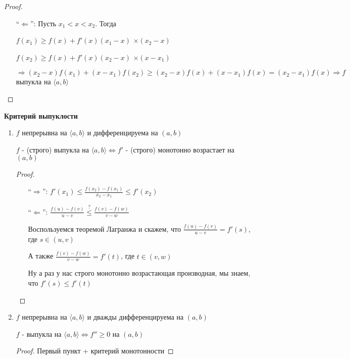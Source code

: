 \begin{theorem-non}
\begin{proof}
\begin{itemize}
            Для доказательства со строгим знаком и строгой монотоннсотью тут нужно плясать с 
            \href{https://youtu.be/CAxh8kYEOlQ?t=6638}{бубном}. Пихнуть между $u$ и $x$ еще одну точку. Например $v$.
            И тогда уже получить неравенство со строгими знаками: $\frac{f(u) - f(x_0)}{u - x_0} < \frac{f(v) - f(x_0)}{v - x_0}< \frac{f(x) - f(x_0)}{x - x_0}$
            \item[``$\Longleftarrow$'':] Пусть $x_1 < x < x_2$. Тогда 
            
            $f(x_1) \geqslant f(x) + f'(x)(x_1 - x)$ \quad $\times (x_2 - x)$
             
            $f(x_2) \geqslant f(x) + f'(x)(x_2 - x)$ \quad $\times (x - x_1)$

            $\Longrightarrow (x_2 - x)f(x_1) + (x - x_1)f(x_2) \geqslant
            (x_2 - x)f(x) + (x - x_1)f(x) = (x_2 - x_1)f(x) \Longrightarrow f$ выпукла на $\langle a, b \rangle$
        \end{itemize}
    \end{proof}
\end{theorem-non}
\textbf{Критерий выпуклости} 

\begin{enumerate}
    \item $f$ непрерывна на $\langle a, b \rangle$ и дифференцируема на $(a, b)$
    
    $f$ - (строго) выпукла на $\langle a, b \rangle \Longleftrightarrow f'$ - (строго) монотонно возрастает на $(a, b)$
    
    \begin{proof} \quad 

        \begin{enumerate}
            \item[``$\Longrightarrow$'':] $f'(x_1) \leqslant \frac{f(x_2) - f(x_1)}{x_2 - x_1} \leqslant f'(x_2)$
            \item[``$\Longleftarrow$'':] $\frac{f(u) - f(v)}{u - v} \overset{?}{\leqslant} \frac{f(v) - f(w)}{v - w}$
            
            Воспользуемся теоремой Лагранжа и скажем, что $\frac{f(u) - f(v)}{u - v} = f'(s)$, где $s \in (u, v)$ 

            А также $\frac{f(v) - f(w)}{v - w} = f'(t)$, где $t \in (v, w)$ 

            Ну а раз у нас строго монотонно возрастающая производная, мы знаем, что $f'(s) \leqslant f'(t)$
        \end{enumerate}
    \end{proof}

    \item $f$ непрерывна на $\langle a, b \rangle$ и дважды дифференцируема на $(a, b)$
    
    $f$ - выпукла на $\langle a, b \rangle \Longleftrightarrow f'' \geqslant 0$ на $(a, b)$
    
    \begin{proof}
        Первый пункт + критерий монотонности 
    \end{proof}
\end{enumerate}

